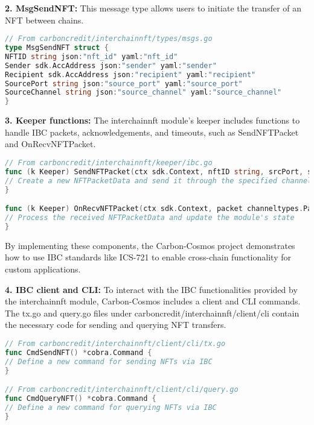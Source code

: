 \documentclass{article}
\begin{document}
\textbf{2. MsgSendNFT:} This message type allows users to initiate the transfer of an NFT between chains.

\begin{lstlisting}[language=Go]
// From carboncredit/interchainnft/types/msgs.go
type MsgSendNFT struct {
NFTID string json:"nft_id" yaml:"nft_id"
Sender sdk.AccAddress json:"sender" yaml:"sender"
Recipient sdk.AccAddress json:"recipient" yaml:"recipient"
SourcePort string json:"source_port" yaml:"source_port"
SourceChannel string json:"source_channel" yaml:"source_channel"
}
\end{lstlisting}

\textbf{3. Keeper functions:} The interchainnft module's keeper includes functions to handle IBC packets, acknowledgements, and timeouts, such as SendNFTPacket and OnRecvNFTPacket.

\begin{lstlisting}[language=Go]
// From carboncredit/interchainnft/keeper/ibc.go
func (k Keeper) SendNFTPacket(ctx sdk.Context, nftID string, srcPort, srcChannel string, timeoutHeight clienttypes.Height, timeoutTimestamp uint64, nft types.BaseNFT) error {
// Create a new NFTPacketData and send it through the specified channel
}

func (k Keeper) OnRecvNFTPacket(ctx sdk.Context, packet channeltypes.Packet, data types.NFTPacketData) error {
// Process the received NFTPacketData and update the module's state
}
\end{lstlisting}

By implementing these components, the Carbon-Cosmos project demonstrates how to use IBC standards like ICS-721 to enable cross-chain functionality for custom applications.

\textbf{4. IBC client and CLI:} To interact with the IBC functionalities provided by the interchainnft module, Carbon-Cosmos includes a client and CLI commands. The tx.go and query.go files under carboncredit/interchainnft/client/cli contain the necessary code for sending and querying NFT transfers.

\begin{lstlisting}[language=Go]
// From carboncredit/interchainnft/client/cli/tx.go
func CmdSendNFT() *cobra.Command {
// Define a new command for sending NFTs via IBC
}

// From carboncredit/interchainnft/client/cli/query.go
func CmdQueryNFT() *cobra.Command {
// Define a new command for querying NFTs via IBC
}
\end{lstlisting}
\end{document}
